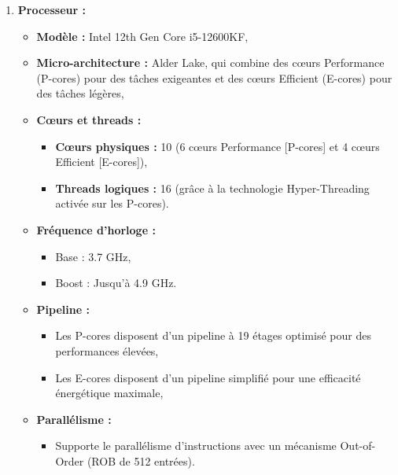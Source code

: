 \documentclass{rapport}
\begin{document}
        \begin{enumerate}
          \item \textbf{Processeur :}

            \begin{itemize}
                \item \textbf{Modèle :} Intel 12th Gen Core i5-12600KF,
                \item \textbf{Micro-architecture :} Alder Lake, qui combine des cœurs Performance (P-cores) pour des tâches exigeantes et des cœurs Efficient (E-cores) pour des tâches légères,
                \item \textbf{Cœurs et threads :}
                    \begin{itemize}
                        \item \textbf{Cœurs physiques :} 10 (6 cœurs Performance [P-cores] et 4 cœurs Efficient [E-cores]),
                        \item \textbf{Threads logiques :} 16 (grâce à la technologie Hyper-Threading activée sur les P-cores).
                    \end{itemize}
                \item \textbf{Fréquence d’horloge :}
                    \begin{itemize}
                        \item Base : 3.7 GHz,
                        \item Boost : Jusqu’à 4.9 GHz.
                    \end{itemize}
                \item \textbf{Pipeline :}
                    \begin{itemize}
                        \item Les P-cores disposent d’un pipeline à 19 étages optimisé pour des performances élevées,
                        \item Les E-cores disposent d’un pipeline simplifié pour une efficacité énergétique maximale,
                    \end{itemize}
                \item \textbf{Parallélisme :}
                    \begin{itemize}
                        \item Supporte le parallélisme d’instructions avec un mécanisme Out-of-Order (ROB de 512 entrées).
                    \end{itemize}
            \end{itemize}
          

\end{enumerate}
\end{document}
